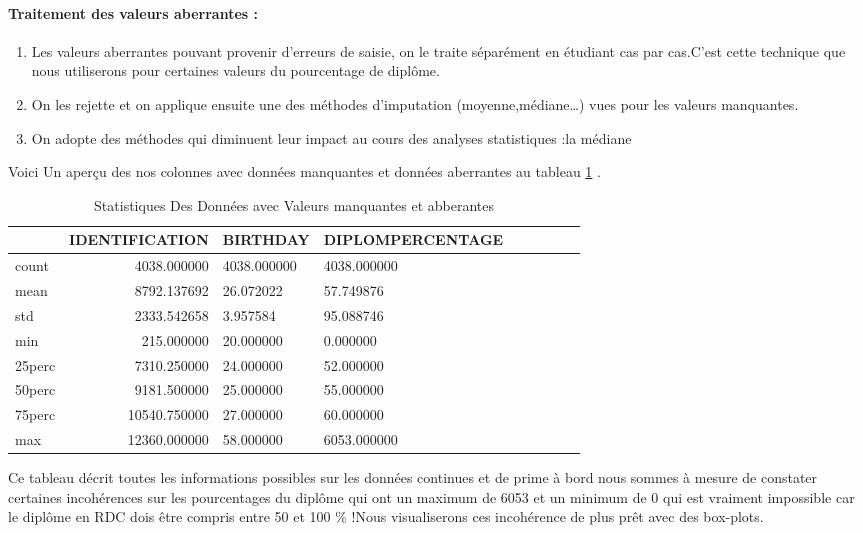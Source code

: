 \paragraph{Traitement des valeurs aberrantes :}
\begin{enumerate}
	\item  Les valeurs aberrantes pouvant provenir d'erreurs de saisie, on le traite séparément
	en étudiant cas par cas.C'est cette technique que nous utiliserons 
	pour certaines valeurs du pourcentage de diplôme.
	\item On les rejette et on applique ensuite une des méthodes d’imputation (moyenne,médiane…) vues pour les valeurs manquantes.
	\item  On adopte des méthodes qui diminuent leur impact au cours des analyses statistiques :la médiane
\end{enumerate}
Voici Un aperçu des nos colonnes avec données manquantes et données aberrantes
au tableau \ref{tab:MisisnV} .
\begin{table}
\centering
\begingroup %
\captionsetup{type=table} %
\caption{Statistiques Des Données avec Valeurs manquantes et abberantes}
\label{tab:MisisnV}
\begin{tabular}{lrlllllll}
	\toprule
	{}& IDENTIFICATION   &  BIRTHDAY &  DIPLOMPERCENTAGE \\
	\midrule  
count  &   4038.000000 & 4038.000000      & 4038.000000\\
mean   &   8792.137692  &   26.072022       &  57.749876 \\
std   &    2333.542658   &  3.957584     &    95.088746\\
min   &     215.000000    &20.000000     &     0.000000\\
25perc  &     7310.250000 &   24.000000     &    52.000000\\
50perc   &   9181.500000  & 25.000000      &   55.000000\\
75perc  &   10540.750000   & 27.000000     &    60.000000 \\
max  &    12360.000000  &  58.000000      & 6053.000000\\
\bottomrule
\end{tabular}
\endgroup
\end{table}

Ce tableau décrit toutes les informations possibles sur les données
continues et de prime à bord nous sommes à mesure de constater certaines
incohérences sur les pourcentages du  diplôme qui ont un maximum de 6053 et un
minimum de 0 qui est vraiment impossible car le diplôme en RDC dois être
compris entre 50 et 100 \% !Nous visualiserons ces incohérence de
plus prêt avec des box-plots.

